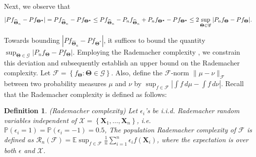 \documentclass[11pt]{article}
\newcommand{\E}{\mathbb{E}}
\newtheorem{defn}{Definition}
\begin{document}
Next, we observe that
\begin{equation}
    |P f_{\widehat{\bm{\Theta}}_n}- P f_{\bm{\Theta^*}}|
    = P f_{\widehat{\bm{\Theta}}_n}- P f_{\bm{\Theta^*}} 
    \le P f_{\widehat{\bm{\Theta}}_n}-P_n f_{\widehat{\bm{\Theta}}_n}+P_n f_{\bm{\Theta^*}} - P f_{\bm{\Theta^*}}\\
    \le 2\sup_{\bm{\Theta}\in \mathscr{G}}|P_n f_{\bm\Theta}-P f_{\bm\Theta}|.
\end{equation}

Towards bounding $|P f_{\widehat{\bm{\Theta}}_n}-P f_{\bm{\Theta}^*}|$, it suffices to bound the quantity $\sup _{\bm{\Theta} \in\mathscr{G}}\left|P_n f_{\bm\Theta} - P f_{\bm\Theta}\right|$. Employing the Rademacher complexity \citep{DUDLEY1967290,FoML-mohri}, we constrain this deviation and subsequently establish an upper bound on the Rademacher complexity. Let $\mathcal{F}=\left\{f_{\bm\Theta}: \bm{\Theta} \in\mathscr{G}\right\}$. Also, define the $\mathcal{F}$-norm $\|\mu-\nu\|_{\mathcal{F}}$ between two probability measures $\mu$ and $\nu$ \citep{athreya2006measure} by $ \sup_{f \in \mathcal{F}}\left|\int f \,d\mu-\int f \,d\nu\right|$. Recall that the Rademacher complexity is defined as follows:

\begin{defn}
    (Rademacher complexity) Let $\epsilon_i$'s be i.i.d. Rademacher random variables independent of $\mathcal{X}=\left\{\boldsymbol{X}_1, \ldots, \boldsymbol{X}_n\right\}$, i.e. $\mathbb{P}\left(\epsilon_i=1\right)=\mathbb{P}\left(\epsilon_i=-1\right)=0.5$, The population Rademacher complexity of $\mathcal{F}$ is defined as $\mathcal{R}_n(\mathcal{F})=\E\sup _{f \in \mathcal{F}} \frac{1}{n} \sum_{i=1}^n \epsilon_i f\left(\boldsymbol{X}_i\right)$, where the expectation is over both $\epsilon$ and $\mathcal{X}$.
\end{defn}
\end{document}
